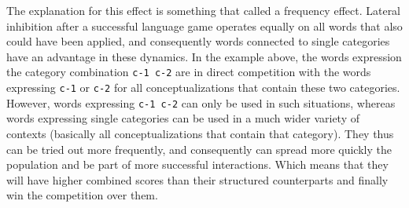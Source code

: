 The explanation for this effect is something that
\cite{debeule06compositionality} called a frequency effect. Lateral
inhibition after a successful language game operates equally on all
words that also could have been applied, and consequently words
connected to single categories have an advantage in these dynamics. In
the example above, the words expression the category combination
\texttt{c-1 c-2} are in direct competition with the words expressing
\texttt{c-1} or \texttt{c-2} for all conceptualizations that contain
these two categories. However, words expressing \texttt{c-1 c-2} can
only be used in such situations, whereas words expressing single
categories can be used in a much wider variety of contexts (basically
all conceptualizations that contain that category). They thus can be
tried out more frequently, and consequently can spread more quickly
the population and be part of more successful interactions. Which
means that they will have higher combined scores than their structured
counterparts and finally win the competition over them.



